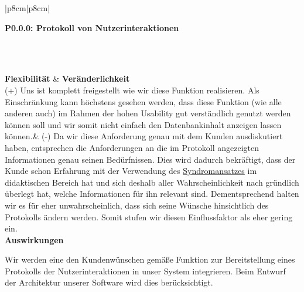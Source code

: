 \documentclass[enabledeprecatedfontcommands,fontsize=11pt,paper=a4,twoside]{scrartcl}
\newcounter{one}
\newcounter{two}[one]
\newcounter{three}[two]
\newcommand{\tone}{0\theone}
\newcommand{\ttwo}{0\thetwo}
\newcommand{\three}{\stepcounter{three}0\thethree}
\begin{document}
\newpage
\begin{tabular} {|p{8cm}|p{8cm}|}
	\hline
	 {\parbox{16cm}{\textbf{\hypertarget{bb}{P\tone.\ttwo.\three}: Protokoll von Nutzerinteraktionen}} }\\ \hline \hline
	\rule{0pt}{11ex}\\ [9ex] \hline
	\textbf{Flexibilität}  & \textbf{Veränderlichkeit} \\
	(+) Uns ist komplett freigestellt wie wir diese Funktion realisieren. Als Einschränkung kann höchstens gesehen werden, dass diese Funktion (wie alle anderen auch) im Rahmen der hohen Usability gut verständlich genutzt werden können soll und wir somit nicht einfach den Datenbankinhalt anzeigen lassen können.&
	(-) Da wir diese Anforderung genau mit dem Kunden ausdiskutiert haben, entsprechen die Anforderungen an die im Protokoll angezeigten Informationen genau seinen Bedürfnissen. Dies wird dadurch bekräftigt, dass der Kunde schon Erfahrung mit der Verwendung des \hyperlink{Syndromansatz}{Syndromansatzes} im didaktischen Bereich hat und sich deshalb aller Wahrscheinlichkeit nach gründlich überlegt hat, welche Informationen für ihn relevant sind. Dementsprechend halten wir es für eher unwahrscheinlich, dass sich seine Wünsche hinsichtlich des Protokolls ändern werden. Somit stufen wir diesen Einflussfaktor als eher gering ein. \\ \hline
	 {\textbf{Auswirkungen}} \\
	 {\parbox{16cm}{Wir werden eine den Kundenwünschen gemäße Funktion zur Bereitstellung eines Protokolls der Nutzerinteraktionen in unser System integrieren. Beim Entwurf der Architektur unserer Software wird dies berücksichtigt.}}\\ \hline
\end{tabular}
\end{document}
